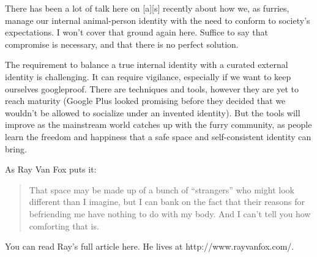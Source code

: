 There has been a lot of talk here on [a][s] recently about how we, as furries, manage our internal animal-person identity with the need to conform to society's expectations. I won't cover that ground again here. Suffice to say that compromise is necessary, and that there is no perfect solution.

The requirement to balance a true internal identity with a curated external identity is challenging. It can require vigilance, especially if we want to keep ourselves googleproof. There are techniques and tools, however they are yet to reach maturity (Google Plus looked promising before they decided that we wouldn't be allowed to socialize under an invented identity). But the tools will improve as the mainstream world catches up with the furry community, as people learn the freedom and happiness that a safe space and self-consistent identity can bring.

As Ray Van Fox puts it:

\begin{quote}
  That space may be made up of a bunch of ``strangers'' who might look different than I imagine, but I can bank on the fact that their reasons for befriending me have nothing to do with my body. And I can't tell you how comforting that is.
\end{quote}

You can read Ray's full article here. He lives at http://www.rayvanfox.com/.
